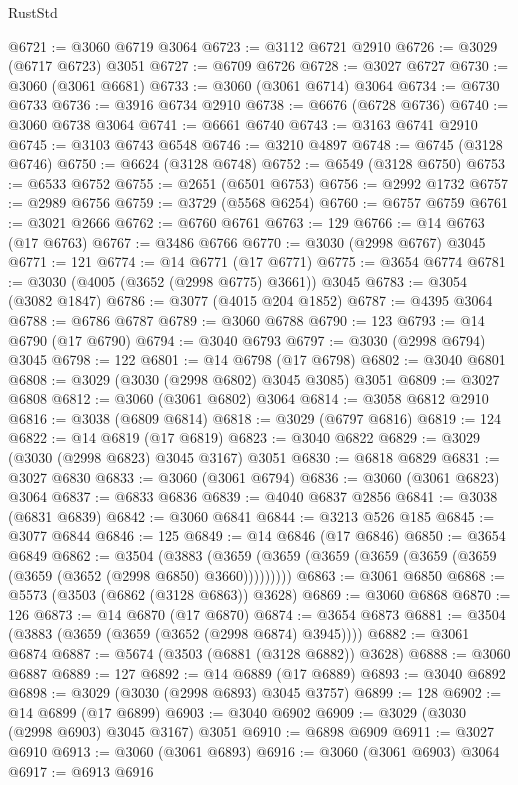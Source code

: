 \begin{lexlean}{RustStd}
\begin{coremodule}
@6721 := @3060 @6719 @3064
@6723 := @3112 @6721 @2910
@6726 := @3029 (@6717 @6723) @3051
@6727 := @6709 @6726
@6728 := @3027 @6727
@6730 := @3060 (@3061 @6681)
@6733 := @3060 (@3061 @6714) @3064
@6734 := @6730 @6733
@6736 := @3916 @6734 @2910
@6738 := @6676 (@6728 @6736)
@6740 := @3060 @6738 @3064
@6741 := @6661 @6740
@6743 := @3163 @6741 @2910
@6745 := @3103 @6743 @6548
@6746 := @3210 @4897
@6748 := @6745 (@3128 @6746)
@6750 := @6624 (@3128 @6748)
@6752 := @6549 (@3128 @6750)
@6753 := @6533 @6752
@6755 := @2651 (@6501 @6753)
@6756 := @2992 @1732
@6757 := @2989 @6756
@6759 := @3729 (@5568 @6254)
@6760 := @6757 @6759
@6761 := @3021 @2666
@6762 := @6760 @6761
@6763 := 129
@6766 := @14 @6763 (@17 @6763)
@6767 := @3486 @6766
@6770 := @3030 (@2998 @6767) @3045
@6771 := 121
@6774 := @14 @6771 (@17 @6771)
@6775 := @3654 @6774
@6781 := @3030 (@4005 (@3652 (@2998 @6775) @3661)) @3045
@6783 := @3054 (@3082 @1847)
@6786 := @3077 (@4015 @204 @1852)
@6787 := @4395 @3064
@6788 := @6786 @6787
@6789 := @3060 @6788
@6790 := 123
@6793 := @14 @6790 (@17 @6790)
@6794 := @3040 @6793
@6797 := @3030 (@2998 @6794) @3045
@6798 := 122
@6801 := @14 @6798 (@17 @6798)
@6802 := @3040 @6801
@6808 := @3029 (@3030 (@2998 @6802) @3045 @3085) @3051
@6809 := @3027 @6808
@6812 := @3060 (@3061 @6802) @3064
@6814 := @3058 @6812 @2910
@6816 := @3038 (@6809 @6814)
@6818 := @3029 (@6797 @6816)
@6819 := 124
@6822 := @14 @6819 (@17 @6819)
@6823 := @3040 @6822
@6829 := @3029 (@3030 (@2998 @6823) @3045 @3167) @3051
@6830 := @6818 @6829
@6831 := @3027 @6830
@6833 := @3060 (@3061 @6794)
@6836 := @3060 (@3061 @6823) @3064
@6837 := @6833 @6836
@6839 := @4040 @6837 @2856
@6841 := @3038 (@6831 @6839)
@6842 := @3060 @6841
@6844 := @3213 @526 @185
@6845 := @3077 @6844
@6846 := 125
@6849 := @14 @6846 (@17 @6846)
@6850 := @3654 @6849
@6862 := @3504
    (@3883 (@3659 (@3659 (@3659 (@3659 (@3659 (@3659 (@3659 (@3652 (@2998 @6850) @3660)))))))))
@6863 := @3061 @6850
@6868 := @5573 (@3503 (@6862 (@3128 @6863)) @3628)
@6869 := @3060 @6868
@6870 := 126
@6873 := @14 @6870 (@17 @6870)
@6874 := @3654 @6873
@6881 := @3504 (@3883 (@3659 (@3659 (@3652 (@2998 @6874) @3945))))
@6882 := @3061 @6874
@6887 := @5674 (@3503 (@6881 (@3128 @6882)) @3628)
@6888 := @3060 @6887
@6889 := 127
@6892 := @14 @6889 (@17 @6889)
@6893 := @3040 @6892
@6898 := @3029 (@3030 (@2998 @6893) @3045 @3757)
@6899 := 128
@6902 := @14 @6899 (@17 @6899)
@6903 := @3040 @6902
@6909 := @3029 (@3030 (@2998 @6903) @3045 @3167) @3051
@6910 := @6898 @6909
@6911 := @3027 @6910
@6913 := @3060 (@3061 @6893)
@6916 := @3060 (@3061 @6903) @3064
@6917 := @6913 @6916

\end{coremodule}
\end{lexlean}
